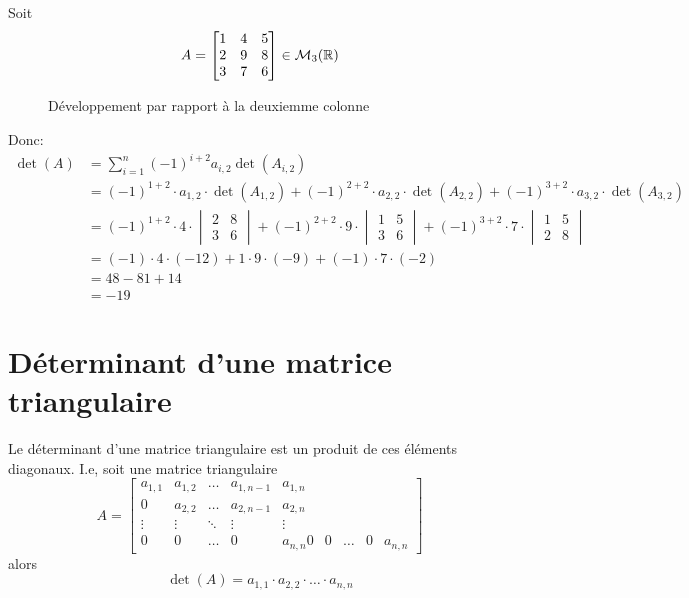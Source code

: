 \begin{eg}
   Soit  
   \[
   A = 
   \begin{bmatrix} 
       1 & 4 & 5\\
       2 & 9 & 8\\
       3 & 7 & 6
   \end{bmatrix} \in \mathcal{M}_3(\mathbb{R})
   \] 

\begin{figure}[H]
    \centering
    \caption{Développement par rapport à la deuxiemme colonne}
    \label{fig:mat-colonne-2}
\end{figure}
Donc:
\begin{align*}
    \det(A) &= \sum_{i=1}^{n} (-1)^{i + 2} a_{i, 2} \det(A_{i, 2}) \\
            &= (-1)^{1 + 2} \cdot a_{1, 2} \cdot \det(A_{1, 2}) + (-1)^{2 + 2} \cdot a_{2, 2} \cdot \det(A_{2,2})  + (-1)^{3 + 2} \cdot a_{3, 2} \cdot \det(A_{3, 2}) \\
            &= (-1)^{1 + 2} \cdot 4 \cdot \begin{vmatrix} 2 & 8 \\ 3 & 6 \end{vmatrix} + (-1)^{2 + 2} \cdot 9 \cdot \begin{vmatrix} 1 & 5 \\ 3 & 6 \end{vmatrix}  + (-1)^{3 + 2} \cdot 7 \cdot \begin{vmatrix} 1 & 5 \\ 2 & 8 \end{vmatrix} \\
            &= (-1) \cdot 4 \cdot (-12) + 1 \cdot 9 \cdot (-9) + (-1) \cdot 7 \cdot (-2)\\
            &= 48 - 81 + 14\\
            &= -19
\end{align*}
\end{eg}

\section{Déterminant d'une matrice triangulaire}
\begin{corollary}
   Le déterminant d'une matrice triangulaire est un produit de ces éléments diagonaux. I.e, soit une matrice triangulaire
   \[
   A = \begin{bmatrix} 
       a_{1, 1} & a_{1, 2} & \ldots & a_{1, n-1} & a_{1, n}\\
       0        & a_{2, 2} & \ldots & a_{2, n-1} & a_{2, n}\\
       \vdots   & \vdots   & \ddots & \vdots     & \vdots  \\
       0        & 0        & \ldots & 0          & a_{n, n}
       0        & 0        & \ldots & 0          & a_{n, n}
   \end{bmatrix} 
   \] 
   alors 
   \[
   \det(A) = a_{1,1} \cdot a_{2,2} \cdot \ldots \cdot a_{n,n}
   \] 
\end{corollary}

